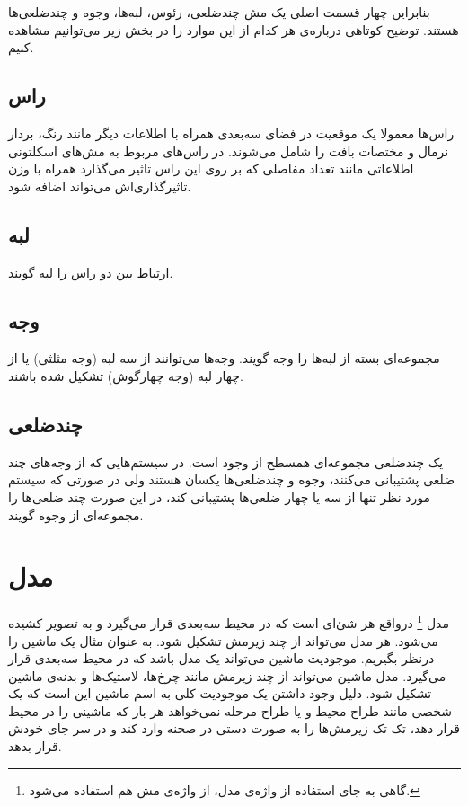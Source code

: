 بنابراین چهار قسمت اصلی یک مش چندضلعی، رئوس، لبه‌ها، وجوه و چندضلعی‌ها هستند. توضیح کوتاهی درباره‌ی هر کدام از این موارد را در بخش زیر می‌توانیم مشاهده کنیم.

\subsection{راس}
راس‌ها معمولا یک موقعیت در فضای سه‌بعدی همراه با اطلاعات دیگر مانند رنگ، بردار نرمال و مختصات بافت را شامل می‌شوند. 
در راس‌های مربوط به مش‌های اسکلتونی اطلاعاتی مانند تعداد مفاصلی که بر روی این راس تاثیر می‌گذارد همراه با وزن تاثیرگذاری‌اش می‌تواند اضافه شود.

\subsection{لبه}
ارتباط بین دو راس را لبه گویند.

\subsection{وجه}
مجموعه‌ای بسته از لبه‌ها را وجه گویند. وجه‌ها می‌توانند از سه لبه 
(وجه مثلثی)
یا از چهار لبه
(وجه چهارگوش)
تشکیل شده باشند.

\subsection{چندضلعی}
یک چندضلعی مجموعه‌ای همسطح از وجود است.
در سیستم‌هایی که از وجه‌های چند ضلعی پشتیبانی می‌کنند، وجوه و چندضلعی‌ها یکسان هستند ولی در صورتی که سیستم مورد نظر تنها از سه یا چهار ضلعی‌ها پشتیبانی کند، در این صورت چند ضلعی‌ها را مجموعه‌ای از وجوه گویند.

\section{مدل}

مدل‌
\footnote{ گاهی به جای استفاده از واژه‌ی مدل، از واژه‌ی مش هم استفاده می‌شود.}
درواقع هر شئ‌ای است که در محیط سه‌بعدی قرار می‌گیرد و به تصویر کشیده ‌می‌شود. هر مدل می‌تواند از چند زیرمش تشکیل شود.
به عنوان مثال یک ماشین را درنظر بگیریم. موجودیت ماشین می‌تواند یک مدل باشد که در محیط سه‌بعدی قرار می‌گیرد. مدل ماشین می‌تواند از چند زیرمش مانند چرخ‌ها، لاستیک‌ها و بدنه‌ی ماشین تشکیل شود. دلیل وجود داشتن یک موجودیت کلی به اسم ماشین این است که یک ‌شخصی مانند طراح محیط و یا طراح مرحله ‌نمی‌خواهد هر بار که ماشینی را در محیط قرار دهد، تک تک زیرمش‌ها را به صورت دستی در صحنه وارد کند و در سر جای خودش قرار بدهد.



